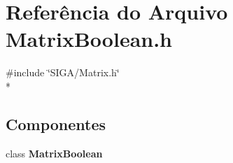 \section{Referência do Arquivo Matrix\+Boolean.\+h}
\label{_matrix_boolean_8h}
{\ttfamily \#include \char`\"{}S\+I\+G\+A/\+Matrix.\+h\char`\"{}}\\*
\subsection*{Componentes}
\begin{DoxyCompactItemize}
\item 
class {\bf Matrix\+Boolean}
\end{DoxyCompactItemize}

